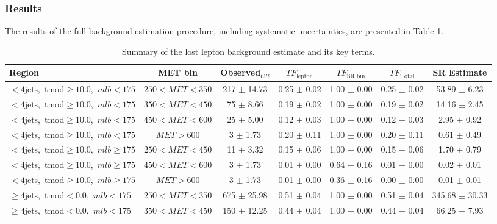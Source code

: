 \subsubsection{Results}
\label{sssec:stop:lostlep:results}

The results of the full background estimation procedure, including
systematic uncertainties, are presented in Table
\ref{tab:stop:lostlep:results}.

\begin{table}
\centering
\small
\caption{Summary of the lost lepton background estimate and its key terms.}
\label{tab:stop:lostlep:results}
\begin{tabular}{|l|c|c|c|c|c|c|} \hline
Region & MET bin & Observed$_{CR}$ & $TF_\text{lepton}$ & $TF_\text{SR bin}$ & $TF_\text{Total}$ & SR Estimate \\ \hline \hline
 $<4$jets,~tmod$\ge10.0$,~$mlb<175$ & $250<MET<350$  & 217 $\pm$ 14.73  & 0.25 $\pm$ 0.02  & 1.00 $\pm$ 0.00 & 0.25 $\pm$ 0.02  & 53.89 $\pm$ 6.23  \\
 $<4$jets,~tmod$\ge10.0$,~$mlb<175$ & $350<MET<450$  & 75 $\pm$ 8.66  & 0.19 $\pm$ 0.02  & 1.00 $\pm$ 0.00 & 0.19 $\pm$ 0.02  & 14.16 $\pm$ 2.45  \\
 $<4$jets,~tmod$\ge10.0$,~$mlb<175$ & $450<MET<600$  & 25 $\pm$ 5.00  & 0.12 $\pm$ 0.03  & 1.00 $\pm$ 0.00 & 0.12 $\pm$ 0.03  & 2.95 $\pm$ 0.92  \\
 $<4$jets,~tmod$\ge10.0$,~$mlb<175$ & $MET>600$  & 3 $\pm$ 1.73  & 0.20 $\pm$ 0.11  & 1.00 $\pm$ 0.00 & 0.20 $\pm$ 0.11  & 0.61 $\pm$ 0.49  \\
\hline
 $<4$jets,~tmod$\ge10.0$,~$mlb\ge175$ & $250<MET<450$  & 11 $\pm$ 3.32  & 0.15 $\pm$ 0.06  & 1.00 $\pm$ 0.00 & 0.15 $\pm$ 0.06  & 1.70 $\pm$ 0.79  \\
 $<4$jets,~tmod$\ge10.0$,~$mlb\ge175$ & $450<MET<600$  & 3 $\pm$ 1.73  & 0.01 $\pm$ 0.00  & 0.64 $\pm$ 0.16 & 0.01 $\pm$ 0.00  & 0.02 $\pm$ 0.01  \\
 $<4$jets,~tmod$\ge10.0$,~$mlb\ge175$ & $MET>600$  & 3 $\pm$ 1.73  & 0.01 $\pm$ 0.00  & 0.36 $\pm$ 0.16 & 0.00 $\pm$ 0.00  & 0.01 $\pm$ 0.01  \\
\hline
 $\ge4$jets,~tmod$<0.0$,~$mlb<175$ & $250<MET<350$  & 675 $\pm$ 25.98  & 0.51 $\pm$ 0.04  & 1.00 $\pm$ 0.00 & 0.51 $\pm$ 0.04  & 345.68 $\pm$ 30.33  \\
 $\ge4$jets,~tmod$<0.0$,~$mlb<175$ & $350<MET<450$  & 150 $\pm$ 12.25  & 0.44 $\pm$ 0.04  & 1.00 $\pm$ 0.00 & 0.44 $\pm$ 0.04  & 66.25 $\pm$ 7.93  \\

\end{tabular}
\end{table}
